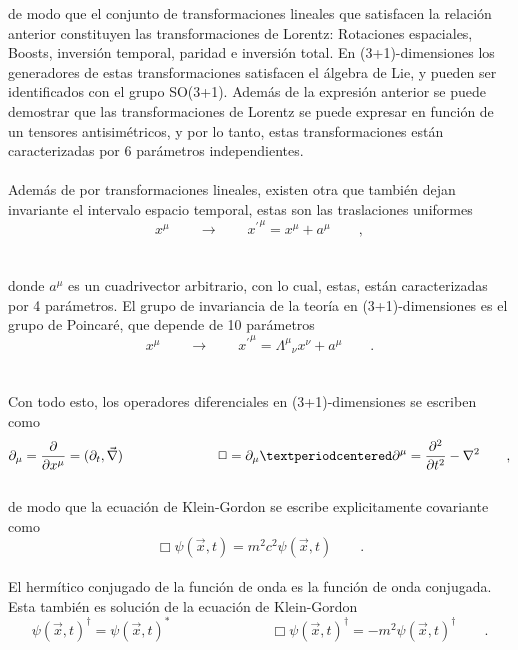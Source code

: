 \documentclass[11pt,letterpaper]{article}     %
\begin{document}
de modo que el conjunto de transformaciones lineales que satisfacen la relación anterior constituyen las transformaciones de  Lorentz: Rotaciones espaciales, Boosts, inversión temporal, paridad e inversión total. En (3+1)-dimensiones los generadores de estas transformaciones satisfacen el álgebra de Lie, y pueden ser identificados con el grupo SO(3+1). Además de la expresión anterior se puede demostrar que las transformaciones de Lorentz se puede expresar en función de un tensores antisimétricos, y por lo tanto, estas transformaciones están caracterizadas por 6 parámetros independientes.  \\ \\
Además de por transformaciones lineales, existen otra que también dejan invariante el intervalo espacio temporal, estas son las traslaciones uniformes
\begin{equation}  \label{eq:10}
x^{\mu} \qquad \rightarrow \qquad {x^{'}}^{\mu}=x^\mu + a^\mu \qquad,
\end{equation}
\\ \\ donde $a^\mu$ es un cuadrivector arbitrario, con lo cual, estas, están caracterizadas por 4 parámetros. El grupo de invariancia de la teoría en (3+1)-dimensiones es el grupo de Poincaré, que depende de 10 parámetros
\begin{equation} \label{eq:11}
x^{\mu} \qquad \rightarrow \qquad {x^{'}}^{\mu}={\Lambda^\mu}_\nu x^\nu + a^\mu \qquad .
\end{equation} \\ \\
Con todo esto, los operadores diferenciales en (3+1)-dimensiones se escriben como
\begin{equation} \label{eq:12}
\partial_\mu = \frac{\partial}{\partial x^\mu}=(\partial_t,\vec{\nabla} ) \hspace{2.5cm} \Box = \partial_\mu·\partial^\mu = \frac{\partial^2}{\partial t^2} - \nabla^2 \qquad ,
\end{equation}\\
de modo que la ecuación de Klein-Gordon se escribe explicitamente covariante como
\begin{equation} \label{eq:13}
\Box \psi(\vec{x},t) = m^2c^2 \psi(\vec{x},t)\qquad .
\end{equation} \\
El hermítico conjugado de la función de onda es la función de onda conjugada. Esta también es solución de la ecuación de Klein-Gordon
\begin{equation} \label{eq:14}
\psi(\vec{x},t)^\dagger=\psi(\vec{x},t)^* \hspace{3cm} \Box \psi(\vec{x},t)^\dagger = -m^2 \psi(\vec{x},t)^\dagger \qquad .
\end{equation}
\end{document}

